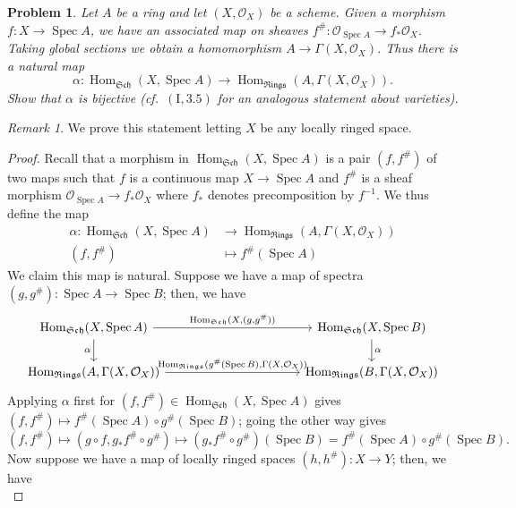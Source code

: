 \documentclass[12pt,letterpaper]{article}
\newtheorem{problem}{Problem}[section]
\theoremstyle{definition}
\theoremstyle{remark}
\newtheorem*{remark}{Remark}
\numberwithin{equation}{section}
\numberwithin{figure}{problem}
\DeclareMathOperator{\Spec}{Spec}
\DeclareMathOperator{\Hom}{Hom}
\newcommand{\OO}{\mathcal{O}}
\newcommand{\Sch}{\mathfrak{Sch}}
\newcommand{\Rings}{\mathfrak{Rings}}
\begin{document}
\begin{problem}
  Let $A$ be a ring and let $(X,\OO_X)$ be a scheme. Given a morphism $f\colon X \to \Spec A$, we have an associated map on sheaves $f^\#\colon\OO_{\Spec A} \to f_*\OO_X$. Taking global sections we obtain a homomorphism $A \to \Gamma(X,\OO_X)$. Thus there is a natural map
  \begin{equation*}
    \alpha\colon\Hom_{\Sch}(X,\Spec A) \to \Hom_\Rings(A,\Gamma(X,\OO_X)).
  \end{equation*}
  Show that $\alpha$ is bijective (cf.~$(\mathrm{I},3.5)$ for an analogous statement about varieties).
\end{problem}
\begin{remark}
  We prove this statement letting $X$ be any locally ringed space.
\end{remark}
\begin{proof}
  Recall that a morphism in $\Hom_{\Sch}(X,\Spec A)$ is a pair $(f,f^\#)$ of two maps such that $f$ is a continuous map $X \to \Spec A$ and $f^\#$ is a sheaf morphism $\OO_{\Spec A} \to f_* \OO_X$ where $f_*$ denotes precomposition by $f^{-1}$. We thus define the map
  \begin{align*}
    \alpha\colon \Hom_{\Sch}(X,\Spec A) &\longrightarrow \Hom_\Rings(A,\Gamma(X,\mathcal{O}_X))\\
    (f,f^\#) &\longmapsto f^\#(\Spec A)
  \end{align*}
  We claim this map is natural. Suppose we have a map of spectra $(g,g^\#)\colon \Spec A \to \Spec B$; then, we have
  \begin{equation*}
    \begin{tikzcd}[column sep=25ex]
      \Hom_\Sch(X,\Spec A) \rar{\Hom_\Sch(X,(g,g^\#))}\dar[swap]{\alpha} & \Hom_\Sch(X,\Spec B)\dar{\alpha}\\
      \Hom_\Rings(A,\Gamma(X,\OO_X)) \rar{\Hom_\Rings(g^\#(\Spec B),\Gamma(X,\OO_X))} & \Hom_\Rings(B,\Gamma(X,\OO_X))
    \end{tikzcd}
  \end{equation*}
  Applying $\alpha$ first for $(f,f^\#) \in \Hom_\Sch(X,\Spec A)$ gives $(f,f^\#) \mapsto f^\#(\Spec A) \circ g^\#(\Spec B)$; going the other way gives
  \begin{equation*}
    (f,f^\#) \mapsto (g \circ f,g_*f^\# \circ g^\#) \mapsto (g_*f^\# \circ g^\#)(\Spec B) = f^\#(\Spec A) \circ g^\#(\Spec B).
  \end{equation*}
  Now suppose we have a map of locally ringed spaces $(h,h^\#) \colon X \to Y$; then, we have
  \begin{equation*}

\end{equation*}
\end{proof}
\end{document}
